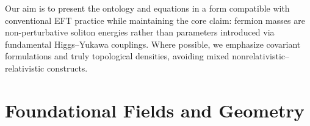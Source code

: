 \documentclass[12pt]{article}
\begin{document}
    Our aim is to present the ontology and equations in a form compatible with conventional EFT practice while maintaining the core claim: fermion masses are non-perturbative soliton energies rather than parameters introduced via fundamental Higgs--Yukawa couplings. Where possible, we emphasize covariant formulations and truly topological densities, avoiding mixed nonrelativistic--relativistic constructs.

    \section{Foundational Fields and Geometry}
\end{document}
